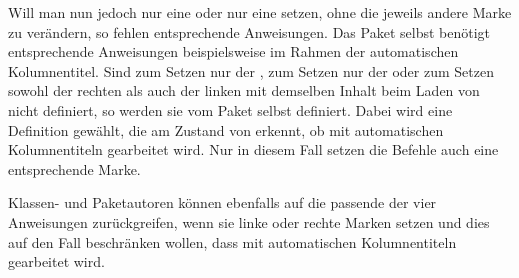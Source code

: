   Will man nun jedoch nur eine  oder nur eine  setzen, ohne die jeweils andere Marke zu verändern, so fehlen
  entsprechende Anweisungen. Das Paket  selbst benötigt entsprechende Anweisungen beispielsweise im Rahmen der
  automatischen Kolumnentitel. Sind  zum Setzen nur der
  ,  zum Setzen nur der  oder  zum Setzen sowohl der rechten als auch der
  linken  mit demselben Inhalt beim Laden von
   nicht definiert, so werden sie vom Paket selbst definiert. Dabei wird eine
  Definition gewählt, die am Zustand von  erkennt, ob mit
  automatischen Kolumnentiteln gearbeitet wird. Nur in diesem Fall setzen die
  Befehle auch eine entsprechende Marke.%

  Klassen- und Paketautoren können ebenfalls auf die passende der vier
  Anweisungen zurückgreifen, wenn sie linke oder rechte Marken setzen und
  dies auf den Fall beschränken wollen, dass mit automatischen Kolumnentiteln
  gearbeitet wird.%
  \EndIndexGroup%
\fi

%
\EndIndexGroup


